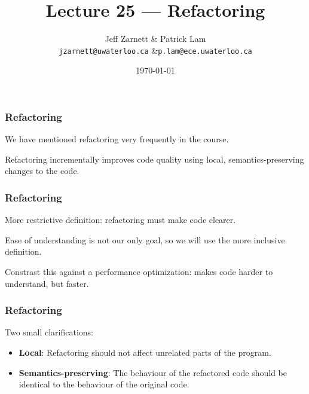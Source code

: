 
\usepackage{tikz-3dplot}

\title{Lecture 25 --- Refactoring}

\author{Jeff Zarnett \& Patrick Lam \\ \small \texttt{jzarnett@uwaterloo.ca} \&\texttt{p.lam@ece.uwaterloo.ca}}
\date{\today}



\begin{frame}
  \titlepage
\end{frame}


\begin{frame}
\frametitle{Refactoring}
\begin{changemargin}{1cm}

We have mentioned refactoring very frequently in the course.

\alert{Refactoring} incrementally improves code quality using local, semantics-preserving changes to the code.

\end{changemargin}
\end{frame}

\begin{frame}
\frametitle{Refactoring}
\begin{changemargin}{1cm}

More restrictive definition: refactoring must make code clearer.

Ease of understanding is not our only goal, so we will use the more inclusive definition.

Constrast this against a performance optimization: makes code harder to understand, but faster.

\end{changemargin}
\end{frame}


\begin{frame}
\frametitle{Refactoring}
\begin{changemargin}{1cm}

Two small clarifications:

\begin{itemize}
\item {\bf Local}: Refactoring should not affect unrelated parts of the
program. 
\item {\bf Semantics-preserving}: The behaviour
of the refactored code should be identical to the behaviour of the
original code. 
\end{itemize}

\end{changemargin}
\end{frame}


